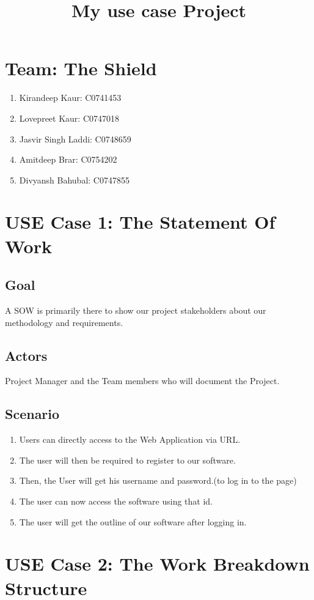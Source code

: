 \documentclass[10pt]{article}
\title{My use case Project}
\begin{document}
\maketitle
\tableofcontents

\section{Team: The Shield}
\begin{enumerate}
\item Kirandeep Kaur: C0741453
\item Lovepreet Kaur: C0747018
\item Jasvir Singh Laddi: C0748659
\item Amitdeep Brar: C0754202
\item Divyansh Bahubal: C0747855
\end{enumerate}

\section{USE Case 1: The Statement Of Work}
\subsection{Goal}
A SOW is primarily there to show our project stakeholders about our methodology and requirements.
\subsection{Actors}
Project Manager and the Team members who will document the Project.
\subsection{Scenario}
\begin{enumerate}
\item Users can directly access to the Web Application via URL.
\item The user will then be required to register to our software.
\item Then, the User will get his username and password.(to log in to the page)
\item The user can now access the software using that id.
\item The user will get the outline of our software after logging in.
\end{enumerate}

\section{USE Case 2: The Work Breakdown Structure}
\end{document}
